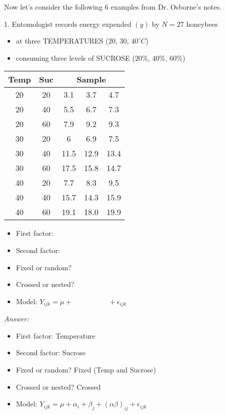 Now let's consider the following 6 examples from Dr. Osborne's notes.

1. Entomologist records energy expended $(y)$ by $N=27$ honeybees
\begin{itemize}
	\item at three TEMPERATURES ($20$, $30$, $ 40^{\circ}C$)
	\item consuming three levels of SUCROSE ($20\%$, $40\%$, $60\%$)
\end{itemize}
\begin{table}[H]
	\renewcommand{\arraystretch}{1.5}
	\centering
	\begin{tabular}{cc|ccc}
		\toprule
		Temp & Suc & \multicolumn{3}{c}{Sample}\\
		\hline
		20 & 20 & 3.1 & 3.7 & 4.7\\
		20 & 40 & 5.5 & 6.7 & 7.3\\
		20 & 60 & 7.9 & 9.2 & 9.3\\
		30 & 20 & 6 & 6.9 & 7.5\\
		30 & 40 & 11.5 & 12.9 & 13.4\\
		30 & 60 & 17.5 & 15.8 & 14.7\\
		40 & 20 & 7.7 & 8.3 & 9.5\\
		40 & 40 & 15.7 & 14.3 & 15.9\\
		40 & 60 & 19.1 & 18.0 & 19.9\\
		\bottomrule
	\end{tabular}
\end{table}

\begin{itemize}
	\item First factor:  
	\item Second factor: 
	\item Fixed or random?  
	\item Crossed or nested?
	\item Model:  $Y_{ijk} = \mu  + \quad \quad \quad \quad \quad  + \epsilon_{ijk}$
\end{itemize}

{\it Answer:}\\
\begin{pf}
\begin{itemize}
	\item First factor:  Temperature
	\item Second factor: Sucrose
	\item Fixed or random?   Fixed (Temp and Sucrose)
	\item Crossed or nested?  Crossed
	\item Model:  $Y_{ijk} = \mu + \alpha_i + \beta_j + (\alpha \beta)_{ij}  + \epsilon_{ijk}$
\end{itemize}
\end{pf}


